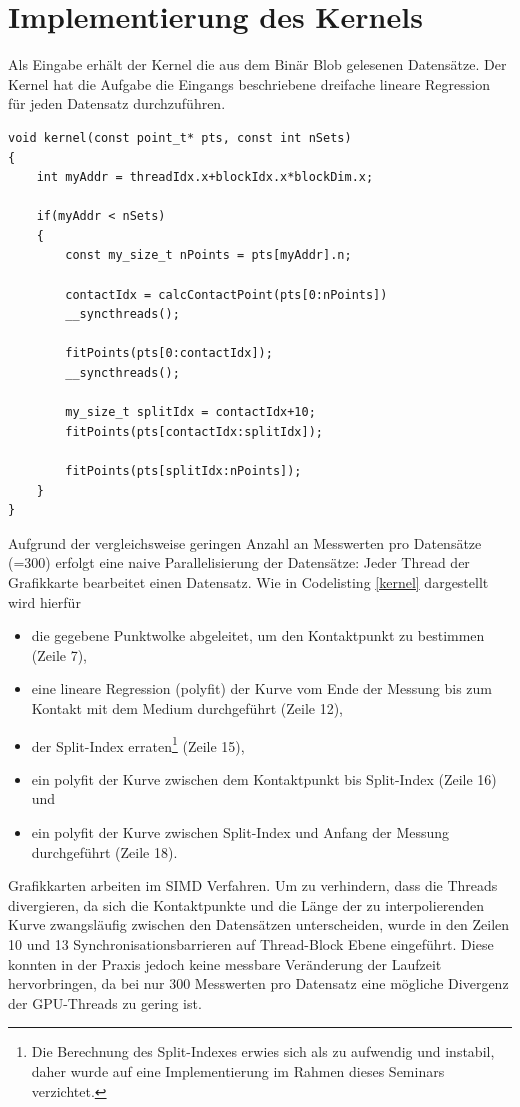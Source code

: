 \section{Implementierung des Kernels}
Als Eingabe erhält der Kernel die aus dem Binär Blob gelesenen Datensätze.
Der Kernel hat die Aufgabe die Eingangs beschriebene dreifache lineare Regression für jeden Datensatz durchzuführen.

\begin{lstlisting}[caption=Implementierung des Kernel in Pseudocode,label=kernel]
void kernel(const point_t* pts, const int nSets)
{
    int myAddr = threadIdx.x+blockIdx.x*blockDim.x;

    if(myAddr < nSets)
    {
        const my_size_t nPoints = pts[myAddr].n;

        contactIdx = calcContactPoint(pts[0:nPoints])
        __syncthreads();

        fitPoints(pts[0:contactIdx]);
        __syncthreads();
                
        my_size_t splitIdx = contactIdx+10;
        fitPoints(pts[contactIdx:splitIdx]);

        fitPoints(pts[splitIdx:nPoints]);
    }
}
\end{lstlisting}


Aufgrund der vergleichsweise geringen Anzahl an Messwerten pro Datensätze (=300) erfolgt eine naive Parallelisierung der Datensätze: Jeder Thread der Grafikkarte bearbeitet einen Datensatz. Wie in Codelisting \ref{kernel} dargestellt wird hierfür

\begin{itemize}
\item die gegebene Punktwolke abgeleitet, um den Kontaktpunkt zu bestimmen (Zeile 7),
\item eine lineare Regression (polyfit) der Kurve vom Ende der Messung bis zum Kontakt mit dem Medium durchgeführt (Zeile 12),
\item der Split-Index erraten\footnote{Die Berechnung des Split-Indexes erwies sich als zu aufwendig und instabil, daher wurde auf eine Implementierung im Rahmen dieses Seminars verzichtet.} (Zeile 15),
\item ein polyfit der Kurve zwischen dem Kontaktpunkt bis Split-Index  (Zeile 16) und
\item ein polyfit der Kurve zwischen Split-Index und Anfang der Messung durchgeführt  (Zeile 18).
\end{itemize}

Grafikkarten arbeiten im SIMD Verfahren. Um zu verhindern, dass die Threads divergieren, da sich die Kontaktpunkte und die Länge der zu interpolierenden Kurve zwangsläufig zwischen den Datensätzen unterscheiden, wurde in den Zeilen 10 und 13 Synchronisationsbarrieren auf Thread-Block Ebene eingeführt.
Diese konnten in der Praxis jedoch keine messbare Veränderung der Laufzeit hervorbringen, da bei nur 300 Messwerten pro Datensatz eine mögliche Divergenz der GPU-Threads zu gering ist.

